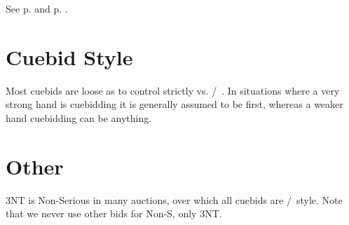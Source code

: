 \documentclass[tom-ari]{subfile}
\begin{document}
See p. \pageref{CIRKLE} and p. \pageref{SQUARE}.

\section{Cuebid Style}

Most cuebids are loose as to \first control strictly vs. \first/~\second.  In situations where a very strong hand is cuebidding it is generally assumed to be first, whereas a weaker hand cuebidding can be anything.

\section{Other}

3NT is Non-Serious in many auctions, over which all cuebids are \first/~\second style.  Note that we never use other bids for Non-S, only 3NT.
\end{document}
